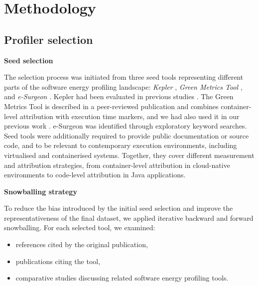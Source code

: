 \documentclass[
  acmsmall,
  screen,
  review,
  xcolor={dvipsnames,usenames}
]{acmart}
\begin{document}
\section{Methodology}

\subsection{Profiler selection}\label{sec:profiler-selection}
\textbf{Seed selection}

The selection process was initiated from three seed tools representing different parts of the software energy profiling landscape: \emph{Kepler} \cite{centofantiImpactPowerConsumption2024,amaralKeplerFrameworkCalculate2023,bellalInvestigatingPotentialKepler}, \emph{Green Metrics Tool} \cite{hoffmannGreenMetricsTool2025}, and \emph{e-Surgeon} \cite{noureddineMonitoringEnergyHotspots2015}. Kepler had been evaluated in previous studies \cite{centofantiImpactPowerConsumption2024,bellalInvestigatingPotentialKepler}. The Green Metrics Tool is described in a peer-reviewed publication \cite{hoffmannGreenMetricsTool2025} and combines container-level attribution with execution time markers, and we had also used it in our previous work \cite{kayembeExploringPrivacySecurity2025}. e-Surgeon was identified through exploratory keyword searches. Seed tools were additionally required to provide public documentation or source code, and to be relevant to contemporary execution environments, including virtualised and containerised systems. Together, they cover different measurement and attribution strategies, from container-level attribution in cloud-native environments to code-level attribution in Java applications.

\textbf{Snowballing strategy}

To reduce the bias introduced by the initial seed selection and improve the representativeness of the final dataset, we applied iterative backward and forward snowballing. For each selected tool, we examined:

\begin{itemize}
    \item references cited by the original publication,
    \item publications citing the tool,
    \item comparative studies discussing related software energy profiling tools.
\end{itemize}
\end{document}
